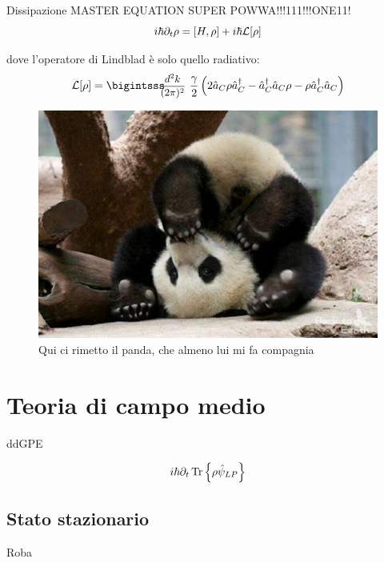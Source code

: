\documentclass[10pt]{beamer}
\begin{document}
\begin{frame}{Dissipazione}
MASTER EQUATION \alert{SUPER POWWA}!!!111!!!ONE11!
\begin{equation*}
i\hbar \partial_t\rho = [H,\rho] + i\hbar \mathcal{L}[\rho]
\end{equation*}

dove l'operatore di Lindblad è solo quello radiativo:
\begin{equation*}
\lind \rho = \intk \frac{\gamma}{2} \left ( 2\oa_C\rho \oa_C^\dagger - \oa_C^\dagger \oa_C \rho - \rho \oa_C^\dagger \oa_C \right )
\end{equation*}

\begin{figure}
       \includegraphics[scale=.3]{files/Panda.jpg}
       \caption{Qui ci rimetto il panda, che almeno lui mi fa compagnia}
      \end{figure}
 
\end{frame}


\section{Teoria di campo medio}

\begin{frame}{ddGPE}

$$i\hbar \partial_t \operatorname{Tr} \left\{ \rho \hat{\psi}_{LP} \right \}$$
\end{frame}

\subsection{Stato stazionario}

\begin{frame}{Roba}
%


\end{frame}
\end{document}
